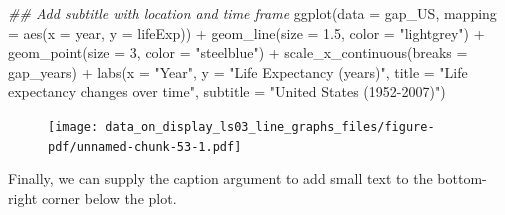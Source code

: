 \documentclass[
  letterpaper,
  DIV=11,
  numbers=noendperiod]{scrreprt}
\newenvironment{Shaded}{\begin{snugshade}}{\end{snugshade}}
\newcommand{\AttributeTok}[1]{\textcolor[rgb]{0.40,0.45,0.13}{#1}}
\newcommand{\DecValTok}[1]{\textcolor[rgb]{0.68,0.00,0.00}{#1}}
\newcommand{\DocumentationTok}[1]{\textcolor[rgb]{0.37,0.37,0.37}{\textit{#1}}}
\newcommand{\FloatTok}[1]{\textcolor[rgb]{0.68,0.00,0.00}{#1}}
\newcommand{\FunctionTok}[1]{\textcolor[rgb]{0.28,0.35,0.67}{#1}}
\newcommand{\NormalTok}[1]{\textcolor[rgb]{0.00,0.23,0.31}{#1}}
\newcommand{\SpecialCharTok}[1]{\textcolor[rgb]{0.37,0.37,0.37}{#1}}
\newcommand{\StringTok}[1]{\textcolor[rgb]{0.13,0.47,0.30}{#1}}
\begin{document}
\begin{Shaded}
\begin{Highlighting}[]
\DocumentationTok{\#\# Add subtitle with location and time frame}
\FunctionTok{ggplot}\NormalTok{(}\AttributeTok{data =}\NormalTok{ gap\_US, }
       \AttributeTok{mapping =} \FunctionTok{aes}\NormalTok{(}\AttributeTok{x =}\NormalTok{ year, }
                     \AttributeTok{y =}\NormalTok{ lifeExp)) }\SpecialCharTok{+}
  \FunctionTok{geom\_line}\NormalTok{(}\AttributeTok{size =} \FloatTok{1.5}\NormalTok{, }
            \AttributeTok{color =} \StringTok{"lightgrey"}\NormalTok{) }\SpecialCharTok{+}
  \FunctionTok{geom\_point}\NormalTok{(}\AttributeTok{size =} \DecValTok{3}\NormalTok{, }
             \AttributeTok{color =} \StringTok{"steelblue"}\NormalTok{) }\SpecialCharTok{+}
  \FunctionTok{scale\_x\_continuous}\NormalTok{(}\AttributeTok{breaks =}\NormalTok{ gap\_years) }\SpecialCharTok{+}
  \FunctionTok{labs}\NormalTok{(}\AttributeTok{x =} \StringTok{"Year"}\NormalTok{,}
       \AttributeTok{y =} \StringTok{"Life Expectancy (years)"}\NormalTok{,}
       \AttributeTok{title =} \StringTok{"Life expectancy changes over time"}\NormalTok{,}
       \AttributeTok{subtitle =} \StringTok{"United States (1952{-}2007)"}\NormalTok{)}
\end{Highlighting}
\end{Shaded}

\begin{figure}[H]

{\centering \texttt{[image: data\_on\_display\_ls03\_line\_graphs\_files/figure-pdf/unnamed-chunk-53-1.pdf]}

}

\end{figure}

Finally, we can supply the caption argument to add small text to the
bottom-right corner below the plot.
\end{document}
